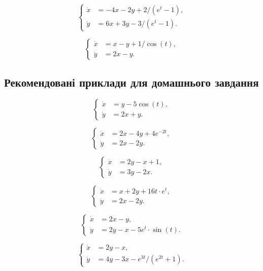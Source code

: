 \begin{problem}
	\[ \left\{ \begin{aligned} \dot x &= - 4 x - 2 y + 2 / (e^t - 1), \\ \dot y &= 6 x + 3 y - 3 / (e^t - 1). \end{aligned} \right. \]
\end{problem}

\begin{problem}
	\[ \left\{ \begin{aligned} \dot x &= x - y + 1 / \cos (t), \\ \dot y &= 2 x - y. \end{aligned} \right. \]
\end{problem}

\subsection*{Рекомендовані приклади для домашнього завдання}

\begin{problem}
	\[ \left\{ \begin{aligned} \dot x &= y - 5 \cos (t), \\ \dot y &= 2 x + y. \end{aligned} \right. \]
\end{problem}

\begin{problem}
	\[ \left\{ \begin{aligned} \dot x &= 2 x - 4 y + 4 e^{-2t}, \\ \dot y &= 2 x - 2 y. \end{aligned} \right. \]
\end{problem}

\begin{problem}
	\[ \left\{ \begin{aligned} \dot x &= 2 y - x + 1, \\ \dot y &= 3 y - 2x. \end{aligned} \right. \]
\end{problem}

\begin{problem}
	\[ \left\{ \begin{aligned} \dot x &= x + 2 y + 16 t \cdot e^t, \\ \dot y &= 2 x - 2 y. \end{aligned} \right. \]
\end{problem}

\begin{problem}
	\[ \left\{ \begin{aligned} \dot x &= 2 x - y, \\ \dot y &= 2 y - x - 5 e^t \cdot \sin (t). \end{aligned} \right. \]
\end{problem}

\begin{problem}
	\[ \left\{ \begin{aligned} \dot x &= 2 y - x, \\ \dot y &= 4 y - 3 x - e^{3 t} / (e^{2 t} + 1). \end{aligned} \right. \]
\end{problem}
